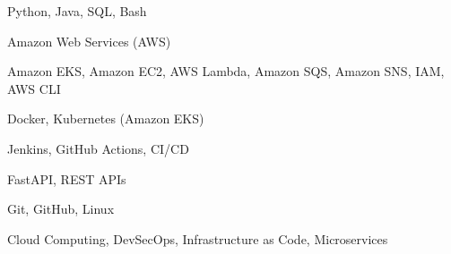 
{Python, Java, SQL, Bash}

{Amazon Web Services (AWS)}

{Amazon EKS, Amazon EC2, AWS Lambda, Amazon SQS, Amazon SNS, IAM, AWS CLI}

{Docker, Kubernetes (Amazon EKS)}

{Jenkins, GitHub Actions, CI/CD}

{FastAPI, REST APIs}

{Git, GitHub, Linux}

{Cloud Computing, DevSecOps, Infrastructure as Code, Microservices}

